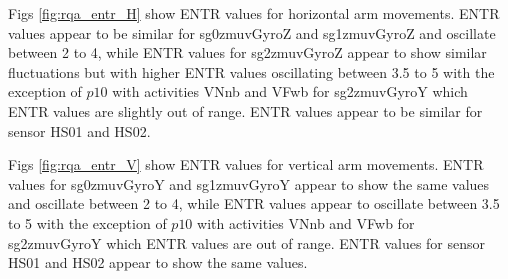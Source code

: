 Figs \ref{fig:rqa_entr_H} show ENTR values for horizontal arm movements.
ENTR values appear to be similar for sg0zmuvGyroZ and sg1zmuvGyroZ 
and oscillate between 2 to 4, while ENTR values for sg2zmuvGyroZ appear 
to show similar fluctuations but with higher ENTR values oscillating 
between 3.5 to 5  with the exception of $p10$ with activities VNnb and VFwb 
for sg2zmuvGyroY which ENTR values are slightly out of range.
ENTR values appear to be similar for sensor HS01 and HS02.

Figs \ref{fig:rqa_entr_V} show ENTR values for vertical arm movements.
ENTR values for sg0zmuvGyroY and sg1zmuvGyroY appear to show the same
values and oscillate between 2 to 4, while ENTR values appear to oscillate
between 3.5 to 5 with the exception of $p10$ with activities VNnb and VFwb 
for sg2zmuvGyroY which ENTR values are out of range.
ENTR values for sensor HS01 and HS02 appear to show the same values. 

